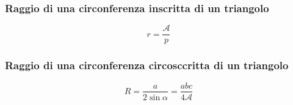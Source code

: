 \subsubsection{Raggio di una circonferenza inscritta di un triangolo}
\begin{equation*}
  r = \frac{\mathscr{A}}{p}
\end{equation*}

\subsubsection{Raggio di una circonferenza circosccritta di un triangolo}
\begin{equation*}
  R = \frac{a}{2\sin\alpha} = \frac{abc}{4\mathscr{A}}
\end{equation*}
